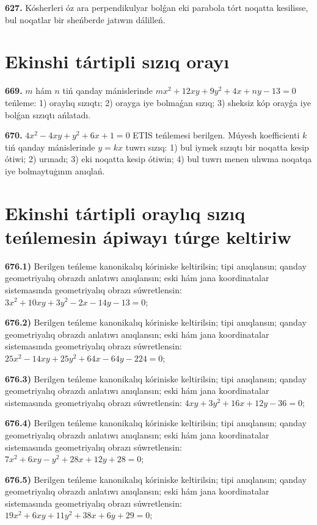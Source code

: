 \textbf{627.} Kósherleri óz ara perpendikulyar bolǵan eki parabola tórt noqatta kesilisse, bul noqatlar bir sheńberde jatıwın dálilleń.



\section{ Ekinshi tártipli sızıq orayı }


\textbf{669.} $m$ hám $n$ tiń qanday mánislerinde $m x^2+12 x y+9 y^2+4 x+n y-13=0$ teńleme: 1) oraylıq sızıqtı; 2) orayga iye bolmaǵan sızıq; 3) sheksiz kóp orayǵa iye bolǵan sızıqtı ańlatadı.

\textbf{670.} $4 x^2-4 x y+y^2+6 x+1=0$ ETIS teńlemesi berilgen. Múyesh koefficienti $k$ tiń qanday mánislerinde $y=kx$ tuwrı sızıq: 1) bul iymek sızıqtı bir noqatta kesip ótiwi; 2) urınadı; 3) eki noqatta kesip ótiwin; 4) bul tuwrı menen ulıwma noqatqa iye bolmaytuģının anıqlań.



\section{Ekinshi tártipli oraylıq sızıq teńlemesin ápiwayı túrge keltiriw}


\textbf{676.1)} Berilgen teńleme kanonikalıq kóriniske keltirilsin; tipi anıqlansın; qanday geometriyalıq obrazdı anlatıwı anıqlansın; eski hám jana koordinatalar sistemasında geometriyalıq obrazı súwretlensin: $3 x^2+10 x y+3 y^2-2 x-14 y-13=0$;

\textbf{676.2)} Berilgen teńleme kanonikalıq kóriniske keltirilsin; tipi anıqlansın; qanday geometriyalıq obrazdı anlatıwı anıqlansın; eski hám jana koordinatalar sistemasında geometriyalıq obrazı súwretlensin: $25 x^2-14 x y+25 y^2+64 x-64 y-224=0$;

\textbf{676.3)} Berilgen teńleme kanonikalıq kóriniske keltirilsin; tipi anıqlansın; qanday geometriyalıq obrazdı anlatıwı anıqlansın; eski hám jana koordinatalar sistemasında geometriyalıq obrazı súwretlensin: $4 x y+3 y^2+16 x+12 y-36=0$;

\textbf{676.4)} Berilgen teńleme kanonikalıq kóriniske keltirilsin; tipi anıqlansın; qanday geometriyalıq obrazdı anlatıwı anıqlansın; eski hám jana koordinatalar sistemasında geometriyalıq obrazı súwretlensin: $7 x^2+6 x y-y^2+28 x+12 y+28=0$;

\textbf{676.5)} Berilgen teńleme kanonikalıq kóriniske keltirilsin; tipi anıqlansın; qanday geometriyalıq obrazdı anlatıwı anıqlansın; eski hám jana koordinatalar sistemasında geometriyalıq obrazı súwretlensin: $19 x^2+6 x y+11 y^2+38 x+6 y+29=0$;

